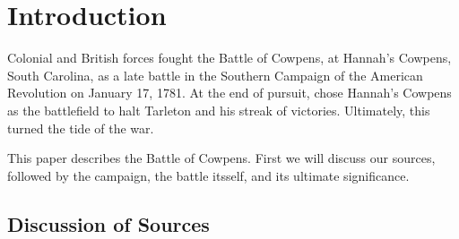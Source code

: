 \section{Introduction}

%

\begin{singlespace}
\end{singlespace}

Colonial and British forces fought the Battle of Cowpens, at Hannah's Cowpens,
South Carolina, as a late battle in the Southern Campaign of the American
Revolution on January 17, 1781. At the end of 
pursuit,  chose Hannah's Cowpens as the
battlefield to halt Tarleton and his streak of victories. Ultimately, this
turned the tide of the war.

This paper describes the Battle of Cowpens. First we will discuss our sources, followed
by the campaign, the battle itsself, and its ultimate significance.


%

%



\subsection{Discussion of Sources}

\begin{singlespace}
\end{singlespace}

